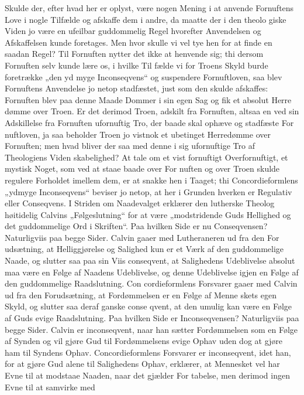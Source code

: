 \documentclass[12pt]{book}
\newcommand{\opage}[1]{\marginnote{\footnotesize\textit{[#1]}}}
\begin{document}
Skulde der, efter hvad her er oplyst, være nogen
Mening i at anvende Fornuftens Love i nogle Tilfælde
og afskaffe dem i andre, da maatte der i den theolo\-%
giske Viden jo være en ufeilbar guddommelig Regel
hvorefter Anvendelsen og Afskaffelsen kunde foretages.
Men hvor skulle vi vel tye hen for at finde en saadan
Regel? Til Fornuften nytter det ikke at henvende sig;
thi dersom Fornuften selv kunde lære os, i hvilke Til\-%
fælde vi for Troens Skyld burde foretrække „den yd\-%
myge Inconseqvens“ og suspendere Fornuftloven, saa
blev Fornuftens Anvendelse jo netop stadfæstet, just
som den skulde afskaffes: Fornuften blev paa denne
Maade Dommer i sin egen Sag og fik et absolut Herre\-%
dømme over Troen. Er det derimod Troen, adskilt fra
Fornuften, altsaa en ved sin Adskillelse fra Fornuften
ufornuftig Tro, der baade skal ophæve og stadfæste For\-%
nuftloven, ja saa beholder Troen jo vistnok et ubetinget
Herredømme over Fornuften; men hvad bliver der saa
med denne i sig ufornuftige Tro af Theologiens Viden\-%
skabelighed? At tale om et vist fornuftigt Overfornuftigt,
et mystisk Noget, som ved at staae baade over For\-%
nuften og over Troen skulde regulere Forholdet imellem
dem, er at snakke hen i Taaget; thi Concordieformlens
„ydmyge Inconseqvens“ beviser jo netop, at her i Grunden
hverken er Regulativ eller Conseqvens. I Striden om
Naadevalget erklærer den lutherske Theolog høitidelig
Calvins „Følgeslutning“ for at være „modstridende Guds
Hellighed og det guddommelige Ord i Skriften“. Paa
hvilken Side er nu Conseqvensen? Naturligviis paa begge
Sider. Calvin gaaer med Lutheraneren ud fra den For\-%
udsætning, at Helliggjørelse og Salighed kun er et Værk
af den guddommelige Naade, og slutter saa paa sin Viis
\opage{248}\setcounter{footnote}{0}%
conseqvent, at Salighedens Udeblivelse absolut maa være
en Følge af Naadens Udeblivelse, og denne Udeblivelse
igjen en Følge af den guddommelige Raadslutning. Con\-%
cordieformlens Forsvarer gaaer med Calvin ud fra den
Forudsætning, at Fordømmelsen er en Følge af Menne\-%
skets egen Skyld, og slutter saa deraf ganske conse\-%
qvent, at den umulig kan være en Følge af Guds evige
Raadslutning. Paa hvilken Side er Inconseqvensen?
Naturligviis paa begge Sider. Calvin er inconseqvent,
naar han sætter Fordømmelsen som en Følge af Synden
og vil gjøre Gud til Fordømmelsens evige Ophav uden
dog at gjøre ham til Syndens Ophav. Concordieformlens
Forsvarer er inconseqvent, idet han, for at gjøre Gud
alene til Salighedens Ophav, erklærer, at Mennesket vel
har Evne til at modstaae Naaden, naar det gjælder For\-%
tabelse, men derimod ingen Evne til at samvirke med
\end{document}
